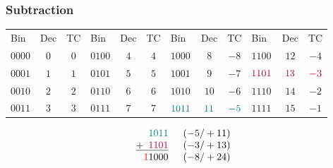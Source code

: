 \documentclass[aspectratio=169]{beamer}
\begin{document}
\begin{frame}
  \frametitle{Subtraction}
  
  \begin{tabular}{l c c|l c c|l c c|l c c}
  Bin & Dec & TC & Bin & Dec & TC & Bin & Dec & TC & Bin & Dec & TC \\
  $0000$ & $ 0$ & $0$ & $0100$ & $ 4$ & $4$ & $1000$ & $ 8$ & $-8$ & $1100$ & $12$ & $-4$ \\
  $0001$ & $ 1$ & $1$ & $0101$ & $ 5$ & $5$ & $1001$ & $ 9$ & $-7$ & $\textcolor{purple}{1101}$ & $\textcolor{purple}{13}$ & $\textcolor{purple}{-3}$ \\
  $0010$ & $ 2$ & $2$ & $0110$ & $ 6$ & $6$ & $1010$ & $10$ & $-6$ & $1110$ & $14$ & $-2$ \\
  $0011$ & $ 3$ & $3$ & $0111$ & $ 7$ & $7$ & $\textcolor{teal}{1011}$ & $\textcolor{teal}{11}$ & $\textcolor{teal}{-5}$ & $1111$ & $15$ & $-1$ \\
  \end{tabular}
  
  \vspace{20pt}

  \begin{equation*}\begin{array}{c}
   \phantom{+9}\textcolor{teal}{1011} \phantom{999} (-5/+11) \\
   \underline{+\phantom{9}\textcolor{purple}{1101}} \phantom{999} (-3/+13) \\
   \phantom{+}\textcolor{red}{1}1000 \phantom{999} (-8/+24)
  \end{array}\end{equation*}
\end{frame}
\end{document}
